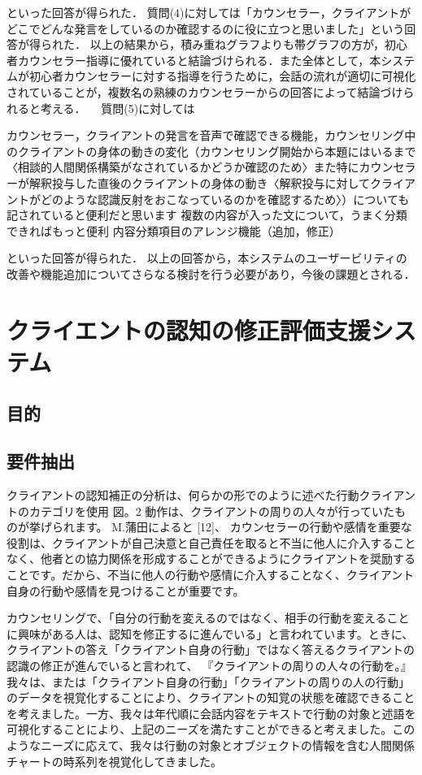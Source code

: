 \documentclass[shuuron]{kuee}
\begin{document}
といった回答が得られた．
質問(4)に対しては「カウンセラー，クライアントが　　どこでどんな発言をしているのか確認するのに役に立つと思いました」という回答が得られた．
以上の結果から，積み重ねグラフよりも帯グラフの方が，初心者カウンセラー指導に優れていると結論づけられる．また全体として，本システムが初心者カウンセラーに対する指導を行うために，会話の流れが適切に可視化されていることが，複数名の熟練のカウンセラーからの回答によって結論づけられると考える．
　質問(5)に対しては

  カウンセラー，クライアントの発言を音声で確認できる機能，カウンセリング中のクライアントの身体の動きの変化（カウンセリング開始から本題にはいるまで〈相談的人間関係構築がなされているかどうか確認のため〉また特にカウンセラーが解釈投与した直後のクライアントの身体の動き〈解釈投与に対してクライアントがどのような認識反射をおこなっているのかを確認するため〉）についても記されていると便利だと思います
  複数の内容が入った文について，うまく分類できればもっと便利
  内容分類項目のアレンジ機能（追加，修正）



といった回答が得られた．
以上の回答から，本システムのユーザービリティの　改善や機能追加についてさらなる検討を行う必要があり，今後の課題とされる．



\chapter{クライエントの認知の修正評価支援システム}
	\section{目的}


\section{要件抽出}

クライアントの認知補正の分析は、何らかの形でのように述べた行動クライアントのカテゴリを使用 図。2 動作は、クライアントの周りの人々が行っていたものが挙げられます。 M.蒲田によると [12]、 カウンセラーの行動や感情を重要な役割は、クライアントが自己決意と自己責任を取ると不当に他人に介入することなく、他者との協力関係を形成することができるようにクライアントを奨励することです。だから、不当に他人の行動や感情に介入することなく、クライアント自身の行動や感情を見つけることが重要です。

  カウンセリングで、「自分の行動を変えるのではなく、相手の行動を変えることに興味がある人は、認知を修正するに進んでいる」と言われています。ときに、クライアントの答え「クライアント自身の行動」ではなく答えるクライアントの認識の修正が進んでいると言われて、 『クライアントの周りの人々の行動を。』
  我々は、または「クライアント自身の行動」「クライアントの周りの人の行動」のデータを視覚化することにより、クライアントの知覚の状態を確認できることを考えました。一方、我々は年代順に会話内容をテキストで行動の対象と述語を可視化することにより、上記のニーズを満たすことができると考えました。このようなニーズに応えて、我々は行動の対象とオブジェクトの情報を含む人間関係チャートの時系列を視覚化してきました。
\end{document}
